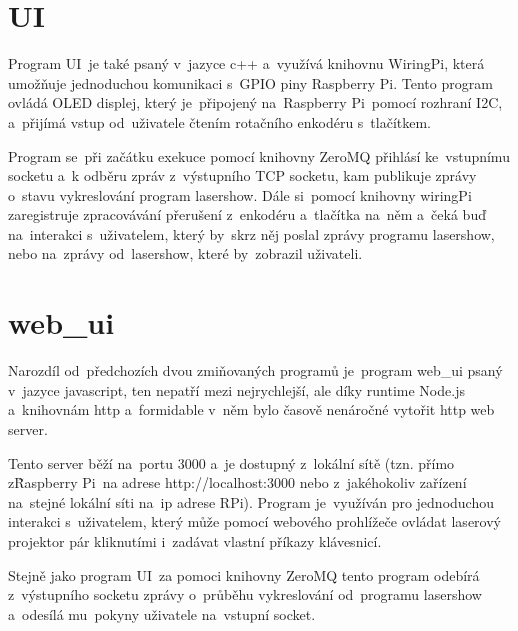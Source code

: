 \section{UI}

Program UI~je také psaný v~jazyce c++ a~využívá knihovnu WiringPi, která umožňuje jednoduchou komunikaci s~GPIO piny Raspberry Pi. Tento program ovládá OLED displej, který je~připojený na~Raspberry Pi~pomocí rozhraní I2C, a~přijímá vstup od~uživatele čtením rotačního enkodéru s~tlačítkem.

Program se~při začátku exekuce pomocí knihovny ZeroMQ přihlásí ke~vstupnímu socketu a~k odběru zpráv z~výstupního TCP socketu, kam publikuje zprávy o~stavu vykreslování program lasershow. Dále si~pomocí knihovny wiringPi zaregistruje zpracovávání přerušení z~enkodéru a~tlačítka na~něm a~čeká buď na~interakci s~uživatelem, který by~skrz něj poslal zprávy programu lasershow, nebo na~zprávy od~lasershow, které by~zobrazil uživateli.


\section{web\_ui}

Narozdíl od~předchozích dvou zmiňovaných programů je~program web\_ui psaný v~jazyce javascript, ten nepatří mezi nejrychlejší, ale díky runtime Node.js a~knihovnám http a~formidable v~něm bylo časově nenáročné vytořit http web server.

Tento server běží na~portu 3000 a~je dostupný z~lokální sítě (tzn. přímo z\~Raspberry Pi~na adrese http://localhost:3000 nebo z~jakéhokoliv zařízení na~stejné lokální síti na~ip adrese RPi).
Program je~využíván pro jednoduchou interakci s~uživatelem, který může pomocí webového prohlížeče ovládat laserový projektor pár kliknutími i~zadávat vlastní příkazy klávesnicí.




Stejně jako program UI~za pomoci knihovny ZeroMQ tento program odebírá z~výstupního socketu zprávy o~průběhu vykreslování od~programu lasershow a~odesílá mu~pokyny uživatele na~vstupní socket.


